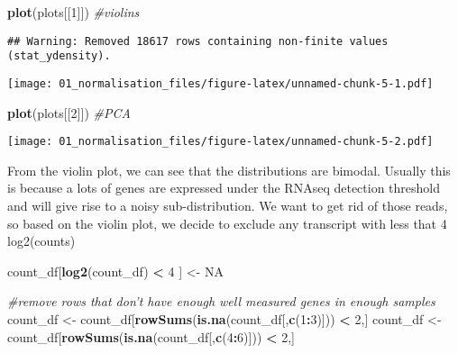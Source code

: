 \documentclass[]{article}
\newenvironment{Shaded}{\begin{snugshade}}{\end{snugshade}}
\newcommand{\CommentTok}[1]{\textcolor[rgb]{0.56,0.35,0.01}{\textit{#1}}}
\newcommand{\DecValTok}[1]{\textcolor[rgb]{0.00,0.00,0.81}{#1}}
\newcommand{\KeywordTok}[1]{\textcolor[rgb]{0.13,0.29,0.53}{\textbf{#1}}}
\newcommand{\NormalTok}[1]{#1}
\newcommand{\OperatorTok}[1]{\textcolor[rgb]{0.81,0.36,0.00}{\textbf{#1}}}
\newcommand{\OtherTok}[1]{\textcolor[rgb]{0.56,0.35,0.01}{#1}}
\newcommand{\StringTok}[1]{\textcolor[rgb]{0.31,0.60,0.02}{#1}}
\begin{document}
\begin{Shaded}
\begin{Highlighting}[]
\KeywordTok{plot}\NormalTok{(plots[[}\DecValTok{1}\NormalTok{]]) }\CommentTok{#violins}
\end{Highlighting}
\end{Shaded}

\begin{verbatim}
## Warning: Removed 18617 rows containing non-finite values (stat_ydensity).
\end{verbatim}

\texttt{[image: 01\_normalisation\_files/figure-latex/unnamed-chunk-5-1.pdf]}

\begin{Shaded}
\begin{Highlighting}[]
\KeywordTok{plot}\NormalTok{(plots[[}\DecValTok{2}\NormalTok{]]) }\CommentTok{#PCA}
\end{Highlighting}
\end{Shaded}

\texttt{[image: 01\_normalisation\_files/figure-latex/unnamed-chunk-5-2.pdf]}

From the violin plot, we can see that the distributions are bimodal.
Usually this is because a lots of genes are expressed under the RNAseq
detection threshold and will give rise to a noisy sub-distribution. We
want to get rid of those reads, so based on the violin plot, we decide
to exclude any transcript with less that 4 log2(counts)

\begin{Shaded}
\begin{Highlighting}[]
\NormalTok{count_df[}\KeywordTok{log2}\NormalTok{(count_df) }\OperatorTok{<}\StringTok{ }\DecValTok{4}\NormalTok{ ] <-}\StringTok{ }\OtherTok{NA}

\CommentTok{#remove rows that don't have enough well measured genes in enough samples}
\NormalTok{count_df <-}\StringTok{ }\NormalTok{count_df[}\KeywordTok{rowSums}\NormalTok{(}\KeywordTok{is.na}\NormalTok{(count_df[,}\KeywordTok{c}\NormalTok{(}\DecValTok{1}\OperatorTok{:}\DecValTok{3}\NormalTok{)])) }\OperatorTok{<}\StringTok{ }\DecValTok{2}\NormalTok{,]}
\NormalTok{count_df <-}\StringTok{ }\NormalTok{count_df[}\KeywordTok{rowSums}\NormalTok{(}\KeywordTok{is.na}\NormalTok{(count_df[,}\KeywordTok{c}\NormalTok{(}\DecValTok{4}\OperatorTok{:}\DecValTok{6}\NormalTok{)])) }\OperatorTok{<}\StringTok{ }\DecValTok{2}\NormalTok{,]}
\end{Highlighting}
\end{Shaded}
\end{document}
